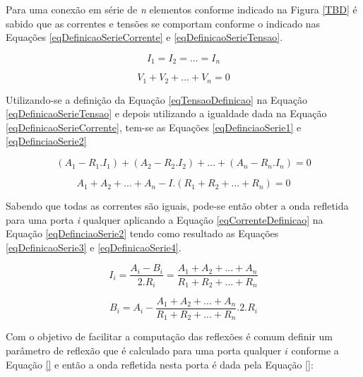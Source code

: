 	Para uma conexão em série de \textit{n} elementos conforme indicado na Figura \ref{TBD} é sabido que as correntes e tensões se comportam conforme o indicado nas Equações \ref{eqDefinicaoSerieCorrente} e \ref{eqDefinicaoSerieTensao}.
	
	
	\begin{equation}
	\label{eqDefinicaoSerieCorrente}
		I_1 = I_2 = ... = I_n
	\end{equation}
	
	\begin{equation}
	\label{eqDefinicaoSerieTensao}
		V_1 + V_2 + ... + V_n = 0	
	\end{equation}
	
	Utilizando-se a definição da Equação \ref{eqTensaoDefinicao} na Equação \ref{eqDefinicaoSerieTensao} e depois utilizando a igualdade dada na Equação \ref{eqDefinicaoSerieCorrente}, tem-se as Equações \ref{eqDefinciaoSerie1} e \ref{eqDefinciaoSerie2}
	
	\begin{equation}
		\label{eqDefinciaoSerie1}
		(A_1-R_1.I_1) + (A_2-R_2.I_2) + ... + (A_n-R_n.I_n) = 0 
	\end{equation}
	
	\begin{equation}
		\label{eqDefinicaoSerie2}
		A_1+A_2+...+A_n -I.(R_1+R_2+...+R_n) = 0
	\end{equation}
	
	Sabendo que todas as correntes são iguais, pode-se então obter a onda refletida para uma porta \textit{i} qualquer aplicando a Equação \ref{eqCorrenteDefinicao} na Equação \ref{eqDefinciaoSerie2} tendo como resultado as Equações \ref{eqDefinicaoSerie3} e \ref{eqDefinicaoSerie4}.
	
	\begin{equation}
		\label{eqDefinicaoSerie3}
		I_i = \frac{A_i - B_i}{2.R_i} = \frac{A_1+A_2+...+A_n}{R_1+R_2+...+R_n}
	\end{equation}
	
	\begin{equation}
		\label{eqDefinicaoSerie4}
		B_i = A_i -\frac{A_1+A_2+...+A_n}{R_1+R_2+...+R_n}.2.R_i 
	\end{equation}
	
	Com o objetivo de facilitar a computação das reflexões é comum definir um parâmetro de reflexão que é calculado para uma porta qualquer $i$ conforme a Equação \ref{} e então a onda refletida nesta porta é dada pela Equação \ref{}:
	

